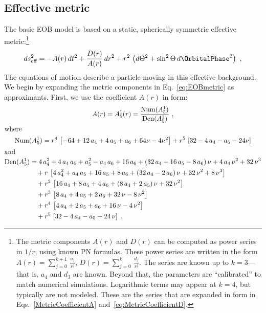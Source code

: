 \documentclass[twoside, aps, prd, letterpaper, noshowpacs, %
amsmath, amssymb, amsfonts, nofootinbib, floatfix, notitlepage]%
{revtex4-1}
\begin{document}
\subsection{Effective metric}
The basic EOB model is based on a static, spherically symmetric
effective metric:\footnote{The metric components $A(r)$ and $D(r)$ can
  be computed as power series in $1/r$, using known PN formulas.
  These power series are written in the form $A(r) =
  \sum_{j=0}^{k+1}\, \frac{a_{j}}{r^{j}}$, $D(r) = \sum_{j=0}^{k}\,
  \frac{d_{j}}{r^{j}}$.  The series are known up to $k=3$---that is,
  $a_{4}$ and $d_{3}$ are known.  Beyond that, the parameters are
  ``calibrated'' to match numerical simulations.  Logarithmic terms
  may appear at $k=4$, but typically are not modeled.  These are the
  series that are expanded in \Pade form in
  Eqs.~\eqref{MetricCoefficientA} and~\eqref{eq:MetricCoefficientD}.}
\begin{equation}
  \label{eq:EOBmetric}
  ds_\text{eff}^2 = -A(r)\,dt^2 + \frac{D(r)}{A(r)}\,dr^2 +
  r^2\,\left(d\Theta^2+\sin^2\Theta\,d\OrbitalPhase^2\right)~,
\end{equation}
The equations of motion describe a particle moving in this effective
background.  We begin by expanding the metric components in
Eq.~\eqref{eq:EOBmetric} as \Pade approximants.  First, we use the
coefficient $A(r)$ in \Pade form:
\begin{gather}
  \label{MetricCoefficientA}
  A(r) = A_5^1(r) = \frac{\mathrm{Num}(A_5^1)}{\mathrm{Den}(A_5^1)}~,
  \\
  \intertext{where}
  \begin{split}
    \mathrm{Num}(A_5^1) = r^4\,\left[-64 + 12\,a_4+4\,a_5+a_6+64 \nu-4
      \nu ^2 \right] + r^5\,\left[32-4\,a_4-a_5-24 \nu \right]
  \end{split}
  \\ \intertext{and}
  \begin{split}
    \mathrm{Den}(A_5^1) &=
    4\,a_4^2 + 4\,a_4\,a_5 + a_5^2 - a_4\,a_6 + 16\,a_6 +
    (32\,a_4 + 16\,a_5 - 8\,a_6)\,\nu + 4\,a_4\,\nu^2 + 32\,\nu ^3 \\
    &\quad + r\,\left[ 4\,a_4^2 + a_4\,a_5 + 16\,a_5 + 8\,a_6 +
      (32\,a_4-2\,a_6)\,\nu + 32\,\nu^2 + 8\,\nu^3 \right]  \\
    &\quad + r^2\,\left[16\,a_4 + 8\,a_5 + 4\,a_6 +
      (8\,a_4+2\,a_5)\,\nu + 32\,\nu^2\right] \\
    &\quad + r^3\,\left[8\,a_4+4\,a_5+2\,a_6+32\,\nu-8\,\nu ^2\right]
    \\
    &\quad + r^4\,\left[4\,a_4+2\,a_5+a_6+16\,\nu-4\,\nu ^2\right] \\
    &\quad + r^5\,\left[32-4\,a_4-a_5+24\,\nu\right]~.
  \end{split}
\end{gather}
\end{document}
